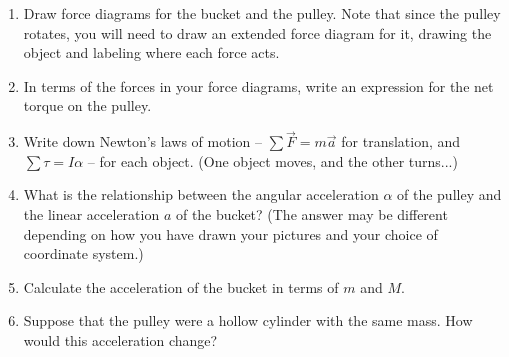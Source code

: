 \documentclass[12pt]{article}
\begin{document}
\begin{enumerate}

\item Draw force diagrams for the bucket and the pulley. Note that since the pulley rotates, you will need
to draw an extended force diagram for it, drawing the object and labeling where each force acts.

\vspace{3in}

\item In terms of the forces in your force diagrams, write an expression for the net torque on the pulley.

\vspace{1in}

\item Write down Newton's laws of motion -- $\sum \vec F = m \vec a$ for translation, and $\sum \tau = I \alpha$
-- for each object. (One object moves, and the other turns...)

\vspace{2in}


\newpage

\item What is the relationship between the angular acceleration $\alpha$ of the pulley and the linear acceleration
$a$ of the bucket? (The answer may be different depending on how you have drawn your pictures and your choice of
coordinate system.)

\vspace{1in}

\item Calculate the acceleration of the bucket in terms of $m$ and $M$.

\vspace{3in}

\item Suppose that the pulley were a hollow cylinder with the same mass. How would this acceleration change?

\end{enumerate}
\end{document}

